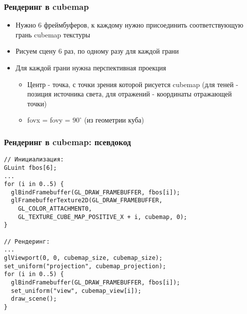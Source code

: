 \documentclass{beamer}
\begin{document}
\begin{frame}[fragile]
\frametitle{Рендеринг в cubemap}
\begin{itemize}
\item Нужно 6 фреймбуферов, к каждому нужно присоединить соответствующую грань cubemap текстуры
\pause
\item Рисуем сцену 6 раз, по одному разу для каждой грани
\pause
\item Для каждой грани нужна перспективная проекция
\begin{itemize}
\item Центр - точка, с точки зрения которой рисуется cubemap (для теней - позиция источника света, для отражений - координаты отражающей точки)
\pause
\item fovx = fovy = \begin{math}90^\circ\end{math} (из геометрии куба)
\end{itemize}
\end{itemize}
\end{frame}

\begin{frame}[fragile]
\frametitle{Рендеринг в cubemap: псевдокод}
\fontsize{10pt}{10pt}
\begin{verbatim}
// Инициализация:
GLuint fbos[6];
... 
for (i in 0..5) {
  glBindFramebuffer(GL_DRAW_FRAMEBUFFER, fbos[i]);
  glFramebufferTexture2D(GL_DRAW_FRAMEBUFFER,
    GL_COLOR_ATTACHMENT0, 
    GL_TEXTURE_CUBE_MAP_POSITIVE_X + i, cubemap, 0);
}

// Рендеринг:
...
glViewport(0, 0, cubemap_size, cubemap_size);
set_uniform("projection", cubemap_projection);
for (i in 0..5) {
  glBindFramebuffer(GL_DRAW_FRAMEBUFFER, fbos[i]);
  set_uniform("view", cubemap_view[i]);
  draw_scene();
}
\end{verbatim}
\end{frame}
\end{document}
